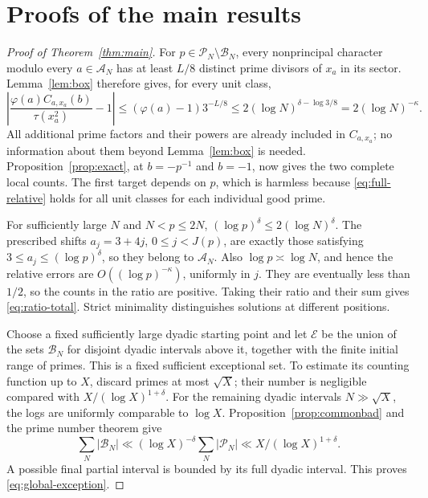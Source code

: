 \documentclass[11pt]{article}
\theoremstyle{remark}\newtheorem{remark}[theorem]{Remark}
\newcommand{\cP}{\mathcal P}
\newcommand{\cA}{\mathcal A}
\newcommand{\cB}{\mathcal B}
\begin{document}
\section{Proofs of the main results}
\begin{proof}[Proof of Theorem~\ref{thm:main}]
For $p\in\cP_N\setminus\cB_N$, every nonprincipal character modulo
every $a\in\cA_N$ has at least $L/8$ distinct prime divisors of $x_a$
in its sector. Lemma~\ref{lem:box} therefore gives, for every unit class,
\begin{equation}\label{eq:full-relative}
 \left|\frac{\varphi(a)C_{a,x_a}(b)}{\tau(x_a^2)}-1\right|
 \le(\varphi(a)-1)3^{-L/8}
 \le2(\log N)^{\delta-\log3/8}
 =2(\log N)^{-\kappa}.
\end{equation}
All additional prime factors and their powers are already included in
$C_{a,x_a}$; no information about them beyond Lemma~\ref{lem:box} is
needed. Proposition~\ref{prop:exact}, at $b=-p^{-1}$ and $b=-1$,
now gives the two complete local counts. The first target depends on
$p$, which is harmless because \eqref{eq:full-relative} holds for all
unit classes for each individual good prime.

For sufficiently large $N$ and $N<p\le2N$,
$(\log p)^\delta\le2(\log N)^\delta$. The prescribed shifts
$a_j=3+4j$, $0\le j<J(p)$, are exactly those satisfying
$3\le a_j\le(\log p)^\delta$, so they belong to $\cA_N$.
Also $\log p\asymp\log N$, and hence the relative errors are
$O((\log p)^{-\kappa})$, uniformly in $j$.
They are eventually less than $1/2$, so the counts in the ratio are
positive. Taking their ratio and their sum gives
\eqref{eq:ratio-total}. Strict minimality distinguishes solutions at
different positions.

Choose a fixed sufficiently large dyadic starting point and let
$\mathcal E$ be the union of the sets $\cB_N$ for disjoint dyadic
intervals above it, together with the finite initial range of primes.
This is a fixed sufficient exceptional set. To estimate its counting
function up to $X$, discard primes at most $\sqrt X$; their number is
negligible compared with $X/(\log X)^{1+\delta}$. For the remaining
dyadic intervals $N\gg\sqrt X$, the logs are uniformly comparable to
$\log X$. Proposition~\ref{prop:commonbad} and the prime number theorem give
\[
 \sum_N|\cB_N|\ll(\log X)^{-\delta}
                      \sum_N|\cP_N|
 \ll X/(\log X)^{1+\delta}.
\]
A possible final partial interval is bounded by its full dyadic
interval. This proves \eqref{eq:global-exception}.

\end{proof}
\end{document}
